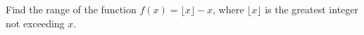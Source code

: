 Find the range of the function $f(x)=\lfloor x\rfloor-x$, where $\lfloor x\rfloor$ is the greatest integer not exceeding $x$.
